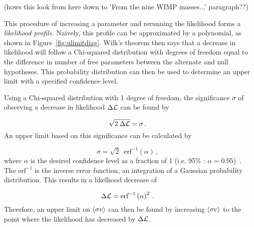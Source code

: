 {\color{red}(hows this look from here down to 'From the nine WIMP masses...' paragraph??)}

This procedure of increasing a parameter and rerunning the likelihood forms a \textit{likelihood profile}.
Naively, this profile can be approximated by a polynomial, as shown in Figure~\ref{fig:ulimitdiag}.
Wilk's theorem then says that a decrease in likelihood will follow a Chi-squared distribution with degrees of freedom equal to the difference in number of free parameters between the alternate and null hypotheses.
This probability distribution can then be used to determine an upper limit with a specified confidence level.

Using a Chi-squared distribution with 1 degree of freedom, the significance $\sigma$ of observing a decrease in likelihood $\Delta\mathcal{L}$ can be found by

\begin{equation}\label{eqn:likeul1}
  \sqrt{2 \: \Delta\mathcal{L}} = \sigma \,.
\end{equation}
An upper limit based on this significance can be calculated by

\begin{equation}\label{eqn:likeul2}
  \sigma = \sqrt{2} \;\: \textrm{erf}^{-1} \left ( \alpha \right ) \,,
\end{equation}
where $\alpha$ is the desired confidence level as a fraction of 1 (i.e. 95\% : $\alpha=0.95$)~\cite{wilks1938,cash1979}.
The $\textrm{erf}^{-1}$ is the inverse error function, an integration of a Gaussian probability distribution.
This results in a likelhood decrease of

\begin{equation}\label{eqn:likeul3}
  \Delta\mathcal{L} = \textrm{erf}^{-1} \left ( \alpha \right )^2 \,.
\end{equation}
Therefore, an upper limit on $\left \langle \sigma v \right \rangle$ can then be found by increasing $\left \langle \sigma v \right \rangle$ to the point where the likelihood has decreased by $\Delta\mathcal{L}$.





